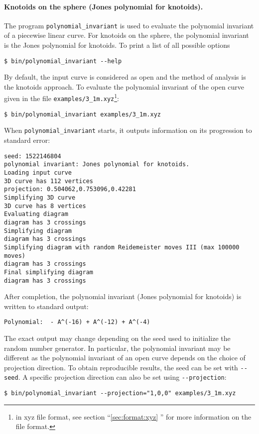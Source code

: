 \paragraph{Knotoids on the sphere (Jones polynomial for knotoids).}
The program \lstinline{polynomial_invariant} is used to evaluate the polynomial invariant of a piecewise linear curve. For knotoids on the sphere, the polynomial invariant is the Jones polynomial for knotoids. To print a list of all possible options
\begin{lstlisting}
$ bin/polynomial_invariant --help
\end{lstlisting}
By default, the input curve is considered as open and the method of analysis is the knotoids approach. To evaluate the polynomial invariant of the open curve given in the file \lstinline{examples/3_1m.xyz}\footnote{in xyz file format, see section ``\ref{sec:format:xyz} '' for more information on the file format.}:
\begin{lstlisting}
$ bin/polynomial_invariant examples/3_1m.xyz
\end{lstlisting}
When \lstinline{polynomial_invariant} starts, it outputs information on its progression to standard error:
\begin{lstlisting}
seed: 1522146804
polynomial invariant: Jones polynomial for knotoids.
Loading input curve
3D curve has 112 vertices
projection: 0.504062,0.753096,0.42281
Simplifying 3D curve
3D curve has 8 vertices
Evaluating diagram
diagram has 3 crossings
Simplifying diagram
diagram has 3 crossings
Simplifying diagram with random Reidemeister moves III (max 100000 moves)
diagram has 3 crossings
Final simplifying diagram
diagram has 3 crossings
\end{lstlisting}
After completion, the polynomial invariant (Jones polynomial for knotoids) is written to standard output:
\begin{lstlisting}
Polynomial:  - A^(-16) + A^(-12) + A^(-4)
\end{lstlisting}
The exact output may change depending on the seed used to initialize the random number generator. In particular, the polynomial invariant may be different as the polynomial invariant of an open curve depends on the choice of projection direction. To obtain reproducible results, the seed can be set with \lstinline{--seed}. A specific projection direction can also be set using \lstinline{--projection}:
\begin{lstlisting}
$ bin/polynomial_invariant --projection="1,0,0" examples/3_1m.xyz
\end{lstlisting}

